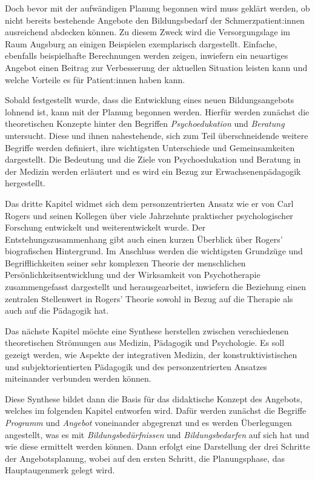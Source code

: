 \documentclass[
  twoside,
  parskip=half-,
  paper=176mm:246mm,
  BCOR=14mm,
  DIV=14,
]{scrreprt}
\begin{document}
Doch bevor mit der aufwändigen Planung begonnen wird muss geklärt werden, ob nicht bereits bestehende Angebote den Bildungsbedarf der Schmerzpatient:innen ausreichend abdecken können. Zu diesem Zweck wird die Versorgungslage im Raum Augsburg an einigen Beispielen exemplarisch dargestellt. Einfache, ebenfalls beispielhafte Berechnungen werden zeigen, inwiefern ein neuartiges Angebot einen Beitrag zur Verbesserung der aktuellen Situation leisten kann und welche Vorteile es für Patient:innen haben kann.

Sobald festgestellt wurde, dass die Entwicklung eines neuen Bildungsangebots lohnend ist, kann mit der Planung begonnen werden. Hierfür werden zunächst die theoretischen Konzepte hinter den Begriffen \textit{Psychoedukation} und \textit{Beratung} untersucht. Diese und ihnen nahestehende, sich zum Teil überschneidende weitere Begriffe werden definiert, ihre wichtigsten Unterschiede und Gemeinsamkeiten dargestellt. Die Bedeutung und die Ziele von Psychoedukation und Beratung in der Medizin werden erläutert und es wird ein Bezug zur Erwachsenenpädagogik hergestellt. 

Das dritte Kapitel widmet sich dem personzentrierten Ansatz wie er von Carl Rogers und seinen Kollegen über viele Jahrzehnte praktischer psychologischer Forschung entwickelt und weiterentwickelt wurde. Der Entstehungszusammenhang gibt auch einen kurzen Überblick über Rogers' biografischen Hintergrund. Im Anschluss werden die wichtigsten Grundzüge und Begrifflichkeiten seiner sehr komplexen Theorie der menschlichen Persönlichkeitsentwicklung und der Wirksamkeit von Psychotherapie zusammengefasst dargestellt und herausgearbeitet, inwiefern die Beziehung einen zentralen Stellenwert in Rogers' Theorie sowohl in Bezug auf die Therapie als auch auf die Pädagogik hat.

Das nächste Kapitel möchte eine Synthese herstellen zwischen verschiedenen theoretischen Strömungen aus Medizin, Pädagogik und Psychologie. Es soll gezeigt werden, wie Aspekte der integrativen Medizin, der konstruktivistischen und subjektorientierten Pädagogik und des personzentrierten Ansatzes miteinander verbunden werden können.

Diese Synthese bildet dann die Basis für das didaktische Konzept des Angebots, welches im folgenden Kapitel entworfen wird. Dafür werden zunächst die Begriffe \textit{Programm} und \textit{Angebot} voneinander abgegrenzt und es werden Überlegungen angestellt, was es mit \textit{Bildungsbedürfnissen} und \textit{Bildungsbedarfen} auf sich hat und wie diese ermittelt werden können. Dann erfolgt eine Darstellung der drei Schritte der Angebotsplanung, wobei auf den ersten Schritt, die Planungsphase, das Hauptaugenmerk gelegt wird.
\end{document}
